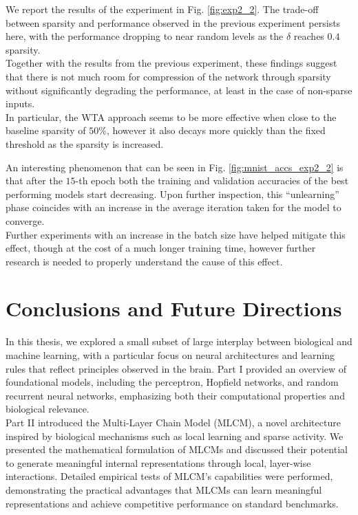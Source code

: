 \documentclass[a4paper,12pt]{report}
\begin{document}
We report the results of the experiment in Fig. \ref{fig:exp2_2}. The trade-off between 
sparsity and performance observed in the previous experiment persists here, with the 
performance dropping to near random levels as the $\delta$ reaches $0.4$ sparsity.\\
Together with the results from the previous experiment, these findings suggest that 
there is not much room for compression of the network through sparsity without 
significantly degrading the performance, at least in the case of non-sparse inputs.\\
In particular, the WTA approach seems to be more effective when close to the baseline 
sparsity of $50\%$, however it also decays more quickly than the fixed threshold as 
the sparsity is increased.
\vspace*{0.5em}

An interesting phenomenon that can be seen in Fig. \ref{fig:mnist_accs_exp2_2} is that
after the $15$-th epoch both the training and validation accuracies of the best 
performing models start decreasing. Upon further inspection, this  ``unlearning'' phase 
coincides with an increase in the average iteration taken for the model to converge. \\
Further experiments with an increase in the batch size have helped mitigate this effect, 
though at the cost of a much longer training time, however further research is needed 
to properly understand the cause of this effect. 

\chapter*{Conclusions and Future Directions}
In this thesis, we explored a small subset of large interplay between biological and 
machine learning, with a particular focus on neural architectures and learning rules 
that reflect principles observed in the brain. Part I provided an overview of 
foundational models, including the perceptron, Hopfield networks, and random recurrent 
neural networks, emphasizing both their computational properties and biological 
relevance. \\
Part II introduced the Multi-Layer Chain Model (MLCM), a novel architecture inspired 
by biological mechanisms such as local learning and sparse activity. We presented the 
mathematical formulation of MLCMs and discussed their potential to generate meaningful 
internal representations through local, layer-wise interactions. Detailed empirical  
tests of MLCM's capabilities were performed, demonstrating the practical advantages 
that MLCMs can learn meaningful representations and achieve competitive performance 
on standard benchmarks.
\vspace*{0.5em}
\end{document}
